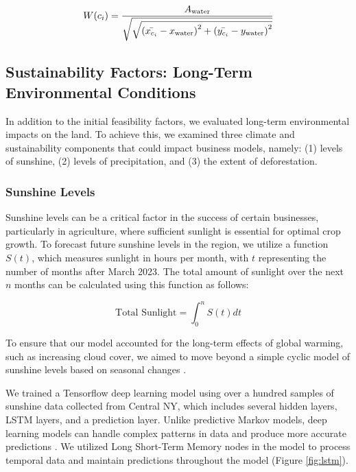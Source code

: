 \documentclass{mcmthesis}
\begin{document}
\begin{align}
W(c_i) = \frac{A_\text{water}}{\sqrt{\sqrt{\left(\Bar{x_{c_i}} - x_{\text{water}}\right)^2 + \left(\Bar{y_{c_i}} - y_{\text{water}}\right)^2}}}
\label{Eq:WaterBody}
\end{align}

\subsection{Sustainability Factors: Long-Term Environmental Conditions}

In addition to the initial feasibility factors, we evaluated long-term environmental impacts on the land. To achieve this, we examined three climate and sustainability components that could impact business models, namely: (1) levels of sunshine, (2) levels of precipitation, and (3) the extent of deforestation.

\subsubsection{Sunshine Levels}

Sunshine levels can be a critical factor in the success of certain businesses, particularly in agriculture, where sufficient sunlight is essential for optimal crop growth. To forecast future sunshine levels in the region, we utilize a function $S(t)$, which measures sunlight in hours per month, with $t$ representing the number of months after March 2023. The total amount of sunlight over the next $n$ months can be calculated using this function as follows:

\begin{equation}
    \text{Total Sunlight} = \int_{0}^{n} S(t) dt
\end{equation}

To ensure that our model accounted for the long-term effects of global warming, such as increasing cloud cover, we aimed to move beyond a simple cyclic model of sunshine levels based on seasonal changes \cite{ceppi_observational_2021}.

We trained a Tensorflow deep learning model using over a hundred samples of sunshine data collected from Central NY, which includes several hidden layers, LSTM layers, and a prediction layer. Unlike predictive Markov models, deep learning models can handle complex patterns in data and produce more accurate predictions \cite{LSTM} \cite{martinabadi_and_tensorflow_nodate}. We utilized Long Short-Term Memory nodes in the model to process temporal data and maintain predictions throughout the model (Figure \ref{fig:lstm}).
\end{document}
